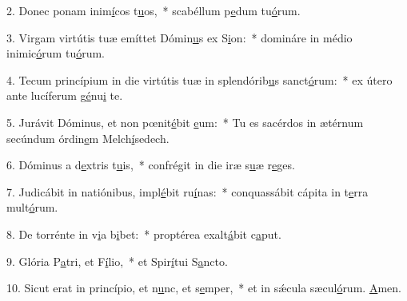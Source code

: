 2. Donec ponam inim\uline{í}cos t\uline{u}os,~* scabéllum p\uline{e}dum tu\uline{ó}rum.\par 
3. Virgam virtútis tuæ emíttet Dómin\uline{u}s ex S\uline{i}on:~* domináre in médio inimic\uline{ó}rum tu\uline{ó}rum.\par 
4. Tecum princípium in die virtútis tuæ in splendórib\uline{u}s sanct\uline{ó}rum:~* ex útero ante lucíferum g\uline{é}nu\uline{i} te.\par 
5. Jurávit Dóminus, et non pœnit\uline{é}bit \uline{e}um:~* Tu es sacérdos in ætérnum secúndum órdin\uline{e}m Melch\uline{í}sedech.\par 
6. Dóminus a d\uline{e}xtris t\uline{u}is,~* confrégit in die iræ s\uline{u}æ r\uline{e}ges.\par 
7. Judicábit in natiónibus, impl\uline{é}bit ru\uline{í}nas:~* conquassábit cápita in t\uline{e}rra mult\uline{ó}rum.\par 
8. De torrénte in v\uline{i}a b\uline{i}bet:~* proptérea exalt\uline{á}bit c\uline{a}put.\par 
9. Glória P\uline{a}tri, et F\uline{í}lio,~* et Spir\uline{í}tui S\uline{a}ncto.\par 
10. Sicut erat in princípio, et n\uline{u}nc, et s\uline{e}mper,~* et in sǽcula sæcul\uline{ó}rum. \uline{A}men.\par 
